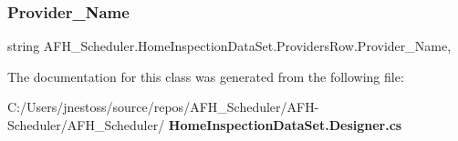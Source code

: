 \mbox{\label{class_a_f_h___scheduler_1_1_home_inspection_data_set_1_1_providers_row_aba172b83d156985840bf7cd07fb56a79}} 
\subsubsection{Provider\_Name}
{\footnotesize\ttfamily string A\+F\+H\+\_\+\+Scheduler.\+Home\+Inspection\+Data\+Set.\+Providers\+Row.\+Provider\+\_\+\+Name\hspace{0.3cm}{\ttfamily [get]}, {\ttfamily [set]}}



The documentation for this class was generated from the following file\+:\begin{DoxyCompactItemize}
\item 
C\+:/\+Users/jnestoss/source/repos/\+A\+F\+H\+\_\+\+Scheduler/\+A\+F\+H-\/\+Scheduler/\+A\+F\+H\+\_\+\+Scheduler/\textbf{ Home\+Inspection\+Data\+Set.\+Designer.\+cs}\end{DoxyCompactItemize}

